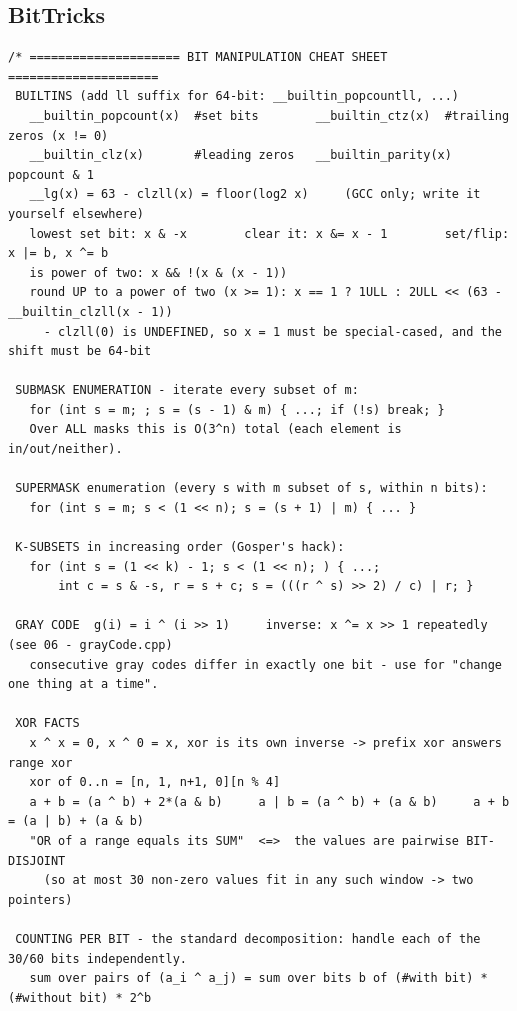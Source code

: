 \documentclass[9pt,a4paper,twocolumn]{extarticle}
\begin{document}
\subsection{BitTricks}
\nopagebreak
\begin{lstlisting}
/* ===================== BIT MANIPULATION CHEAT SHEET =====================
 BUILTINS (add ll suffix for 64-bit: __builtin_popcountll, ...)
   __builtin_popcount(x)  #set bits        __builtin_ctz(x)  #trailing zeros (x != 0)
   __builtin_clz(x)       #leading zeros   __builtin_parity(x) popcount & 1
   __lg(x) = 63 - clzll(x) = floor(log2 x)     (GCC only; write it yourself elsewhere)
   lowest set bit: x & -x        clear it: x &= x - 1        set/flip: x |= b, x ^= b
   is power of two: x && !(x & (x - 1))
   round UP to a power of two (x >= 1): x == 1 ? 1ULL : 2ULL << (63 - __builtin_clzll(x - 1))
     - clzll(0) is UNDEFINED, so x = 1 must be special-cased, and the shift must be 64-bit

 SUBMASK ENUMERATION - iterate every subset of m:
   for (int s = m; ; s = (s - 1) & m) { ...; if (!s) break; }
   Over ALL masks this is O(3^n) total (each element is in/out/neither).

 SUPERMASK enumeration (every s with m subset of s, within n bits):
   for (int s = m; s < (1 << n); s = (s + 1) | m) { ... }

 K-SUBSETS in increasing order (Gosper's hack):
   for (int s = (1 << k) - 1; s < (1 << n); ) { ...;
       int c = s & -s, r = s + c; s = (((r ^ s) >> 2) / c) | r; }

 GRAY CODE  g(i) = i ^ (i >> 1)     inverse: x ^= x >> 1 repeatedly (see 06 - grayCode.cpp)
   consecutive gray codes differ in exactly one bit - use for "change one thing at a time".

 XOR FACTS
   x ^ x = 0, x ^ 0 = x, xor is its own inverse -> prefix xor answers range xor
   xor of 0..n = [n, 1, n+1, 0][n % 4]
   a + b = (a ^ b) + 2*(a & b)     a | b = (a ^ b) + (a & b)     a + b = (a | b) + (a & b)
   "OR of a range equals its SUM"  <=>  the values are pairwise BIT-DISJOINT
     (so at most 30 non-zero values fit in any such window -> two pointers)

 COUNTING PER BIT - the standard decomposition: handle each of the 30/60 bits independently.
   sum over pairs of (a_i ^ a_j) = sum over bits b of (#with bit) * (#without bit) * 2^b


\end{lstlisting}
\end{document}
